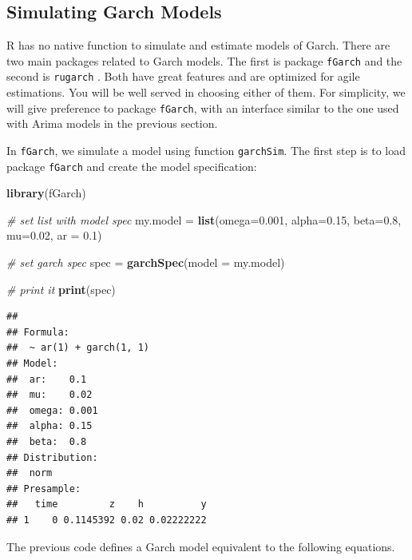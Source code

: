\documentclass[11pt,]{book}
\newenvironment{Shaded}{\begin{snugshade}}{\end{snugshade}}
\newcommand{\KeywordTok}[1]{\textcolor[rgb]{0.27,0.27,0.27}{\textbf{#1}}}
\newcommand{\DataTypeTok}[1]{\textcolor[rgb]{0.27,0.27,0.27}{#1}}
\newcommand{\FloatTok}[1]{\textcolor[rgb]{0.06,0.06,0.06}{#1}}
\newcommand{\StringTok}[1]{\textcolor[rgb]{0.5,0.5,0.5}{#1}}
\newcommand{\CommentTok}[1]{\textcolor[rgb]{0.56,0.35,0.01}{\textit{#1}}}
\newcommand{\NormalTok}[1]{#1}
\begin{document}
\subsection{Simulating Garch Models}\label{simulating-garch-models}

R has no native function to simulate and estimate models of Garch. There
are two main packages related to Garch models. The first is package
\texttt{fGarch} \citep{fgarch} and the second is \texttt{rugarch}
\citep{rugarch}. Both have great features and are optimized for agile
estimations. You will be well served in choosing either of them. For
simplicity, we will give preference to package \texttt{fGarch}, with an
interface similar to the one used with Arima models in the previous
section.  

In \texttt{fGarch}, we simulate a model using function
\texttt{garchSim}. The first step is to load package \texttt{fGarch} and
create the model specification: 

\begin{Shaded}
\begin{Highlighting}[]
\KeywordTok{library}\NormalTok{(fGarch)}

\CommentTok{# set list with model spec}
\NormalTok{my.model =}\StringTok{ }\KeywordTok{list}\NormalTok{(}\DataTypeTok{omega=}\FloatTok{0.001}\NormalTok{, }
                \DataTypeTok{alpha=}\FloatTok{0.15}\NormalTok{, }
                \DataTypeTok{beta=}\FloatTok{0.8}\NormalTok{, }
                \DataTypeTok{mu=}\FloatTok{0.02}\NormalTok{, }
                \DataTypeTok{ar =} \FloatTok{0.1}\NormalTok{)}

\CommentTok{# set garch spec                }
\NormalTok{spec =}\StringTok{ }\KeywordTok{garchSpec}\NormalTok{(}\DataTypeTok{model =}\NormalTok{ my.model)}

\CommentTok{# print it}
\KeywordTok{print}\NormalTok{(spec)}
\end{Highlighting}
\end{Shaded}

\begin{verbatim}
## 
## Formula: 
##  ~ ar(1) + garch(1, 1)
## Model:
##  ar:    0.1
##  mu:    0.02
##  omega: 0.001
##  alpha: 0.15
##  beta:  0.8
## Distribution: 
##  norm
## Presample: 
##   time         z    h          y
## 1    0 0.1145392 0.02 0.02222222
\end{verbatim}

The previous code defines a Garch model equivalent to the following
equations.
\end{document}
